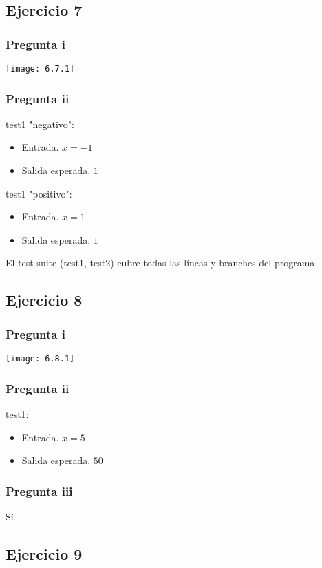 \subsection{Ejercicio 7}
\subsubsection{Pregunta i}
\texttt{[image: 6.7.1]}

\subsubsection{Pregunta ii}
test1 "negativo":
\begin{itemize}
    \item Entrada. $ x = -1 $
    \item Salida esperada. $ 1 $
\end{itemize}

test1 "positivo":
\begin{itemize}
    \item Entrada. $ x = 1 $
    \item Salida esperada. $ 1 $
\end{itemize}

El test suite (test1, test2) cubre todas las líneas y branches del programa.

\subsection{Ejercicio 8}
\subsubsection{Pregunta i}
\texttt{[image: 6.8.1]}

\subsubsection{Pregunta ii}
test1:
\begin{itemize}
    \item Entrada. $ x = 5 $
    \item Salida esperada. $ 50 $
\end{itemize}

\subsubsection{Pregunta iii}
Sí

\subsection{Ejercicio 9}
